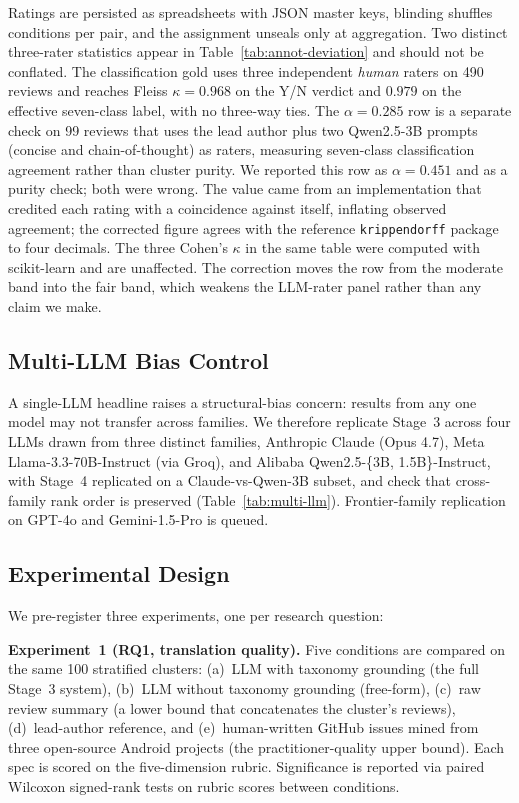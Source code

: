 \documentclass[sigconf, anonymous]{acmart}
\begin{document}
Ratings are persisted as spreadsheets with JSON master keys, blinding shuffles conditions per pair, and the assignment unseals only at aggregation. Two distinct three-rater statistics appear in Table~\ref{tab:annot-deviation} and should not be conflated. The classification gold uses three independent \emph{human} raters on 490 reviews and reaches Fleiss $\kappa = 0.968$ on the Y/N verdict and $0.979$ on the effective seven-class label, with no three-way ties. The $\alpha = 0.285$ row is a separate check on 99 reviews that uses the lead author plus two
Qwen2.5-3B prompts (concise and chain-of-thought) as raters, measuring seven-class classification
agreement rather than cluster purity. We reported this row as $\alpha = 0.451$ and as a purity
check; both were wrong. The value came from an implementation that credited each rating with a
coincidence against itself, inflating observed agreement; the corrected figure agrees with the
reference \texttt{krippendorff} package to four decimals. The three Cohen's $\kappa$ in the same
table were computed with scikit-learn and are unaffected. The correction moves the row from the
moderate band into the fair band, which weakens the LLM-rater panel rather than any claim we make.

\subsection{Multi-LLM Bias Control}\label{multi-llm-setup}
 A single-LLM headline raises a structural-bias concern: results from any one model may not
  transfer across families. We therefore replicate Stage~3 across four LLMs drawn from three
  distinct families, Anthropic Claude (Opus 4.7), Meta Llama-3.3-70B-Instruct (via Groq), and
  Alibaba Qwen2.5-\{3B, 1.5B\}-Instruct, with Stage~4 replicated on a Claude-vs-Qwen-3B subset,
  and check that cross-family rank order is preserved (Table~\ref{tab:multi-llm}).
  Frontier-family replication on GPT-4o and Gemini-1.5-Pro is queued.



\subsection{Experimental Design}
We pre-register three experiments, one per research question:

\textbf{Experiment~1 (RQ1, translation quality).} Five conditions are compared on the same 100 stratified clusters: (a)~LLM with taxonomy grounding (the full Stage~3 system), (b)~LLM without taxonomy grounding (free-form), (c)~raw review summary (a lower bound that concatenates the cluster's reviews), (d)~lead-author reference, and (e)~human-written GitHub issues mined from three open-source Android projects (the practitioner-quality upper bound). Each spec is scored on the five-dimension rubric. Significance is reported via paired Wilcoxon
signed-rank tests on rubric scores between conditions.
\end{document}

